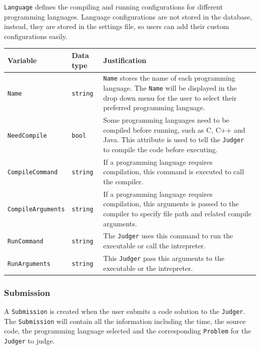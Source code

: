 \documentclass[a4paper]{report}
\newcommand{\code}{\texttt}
\begin{document}
\code{Language} defines the compiling and running configurations for different programming languages. Language configurations are not stored in the database, instead, they are stored in the settings file, so users can add their custom configurations easily.

\begin{tabulary}{\textwidth}{|l|l|L|}
    \hline
    Variable & Data type & Justification \\
    \hline
    \code{Name} & \code{string} & \code{Name} stores the name of each programming language. The \code{Name} will be displayed in the drop down menu for the user to select their preferred programming language. \\
    \hline
    \code{NeedCompile} & \code{bool} & Some programming languages need to be compiled before running, such as C, C++ and Java. This attribute is used to tell the \code{Judger} to compile the code before executing. \\
    \hline
    \code{CompileCommand} & \code{string} & If a programming language requires compilation, this command is executed to call the compiler. \\
    \hline
    \code{CompileArguments} & \code{string} & If a programming language requires compilation, this arguments is passed to the compiler to specify file path and related compile arguments. \\
    \hline
    \code{RunCommand} & \code{string} & The \code{Judger} uses this command to run the executable or call the intrepreter. \\
    \hline
    \code{RunArguments} & \code{string} & This \code{Judger} pass this arguments to the executable or the intrepreter. \\
    \hline
\end{tabulary}

\subsubsection{Submission}

A \code{Submission} is created when the user submits a code solution to the \code{Judger}. The \code{Submission} will contain all the information including the time, the source code, the programming language selected and the corresponding \code{Problem} for the \code{Judger} to judge.
\end{document}
